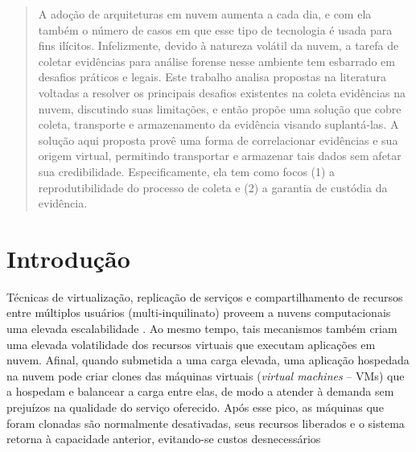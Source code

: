 \documentclass[conference]{IEEEtran}
\begin{document}
\maketitle

\begin{abstract}
A adoção de arquiteturas em nuvem aumenta a cada dia, e com ela também o número de casos em que esse tipo de tecnologia é usada para fins ilícitos. 
%
Infelizmente, devido à natureza volátil da nuvem, a tarefa de coletar evidências para análise forense nesse ambiente tem esbarrado em desafios práticos e legais.
%
Este trabalho analisa propostas na literatura voltadas a resolver os principais desafios existentes na coleta evidências na nuvem, discutindo suas limitações, e então propõe uma solução que cobre coleta, transporte e armazenamento da evidência visando suplantá-las. 
%
A solução aqui proposta provê uma forma de correlacionar evidências e sua origem virtual, permitindo transportar e armazenar tais dados sem afetar sua credibilidade.
%
Especificamente, ela tem como focos (1) a reprodutibilidade do processo de coleta e (2) a garantia de custódia da evidência.

\end{abstract}





%
\IEEEpeerreviewmaketitle

\section{Introdução}

%
Técnicas de virtualização, replicação de serviços e compartilhamento de recursos entre múltiplos usuários (multi-inquilinato) proveem a nuvens computacionais uma elevada escalabilidade \cite{Morsy_Cloud_Security:2010}.
%
Ao mesmo tempo, tais mecanismos também criam uma elevada volatilidade dos recursos virtuais que executam aplicações em nuvem.
%
Afinal, quando submetida a uma carga elevada, uma aplicação hospedada na nuvem pode criar clones das máquinas virtuais (\textit{virtual machines} -- VMs) que a hospedam e balancear a carga entre elas, de modo a atender à demanda sem prejuízos na qualidade do serviço oferecido. 
%
Após esse pico, as máquinas que foram clonadas são normalmente desativadas, seus recursos liberados e o sistema retorna à capacidade anterior, evitando-se custos desnecessários
\end{document}
